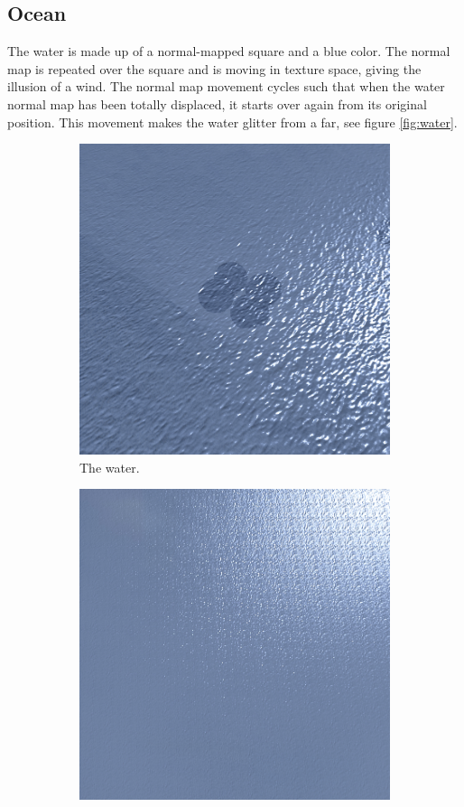 \subsection{Ocean}
The water is made up of a normal-mapped square and a blue color. The normal map is repeated over the square and is moving in texture space, giving the illusion of a wind. The normal map movement cycles such that when the water normal map has been totally displaced, it starts over again from its original position. This movement makes the water glitter from a far, see figure \ref{fig:water}.
\begin{figure}[H]
\begin{subfigure}{.5\textwidth}
  \centering
  \includegraphics[width=0.9\linewidth]{images/waterWaves.jpg}
  \caption{The water.}
  \label{fig:waterWaves}
\end{subfigure}%
\begin{subfigure}{.5\textwidth}
  \centering
  \includegraphics[width=0.9\linewidth]{images/waterGlimmer.jpg}

\end{subfigure}
\end{figure}
